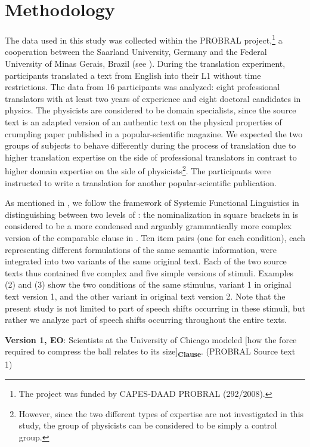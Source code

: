 \documentclass[output=paper]{LSP/langsci}
\begin{document}
\section{Methodology}\label{serbinaetal:sec:3}
The %
data used in this study was collected within the PROBRAL project,\footnote{The project was funded by CAPES-DAAD PROBRAL (292/2008).} a cooperation between the Saarland University, Germany and the Federal University of Minas Gerais, Brazil (see \citealt{Neumann2010}). During the translation experiment, participants translated a text from English into their L1  without time restrictions. The data from 16 participants was analyzed: eight professional translators with at least two years of experience and eight doctoral candidates in physics. The physicists are considered to be domain specialists, since the source text is an adapted version of an authentic text on the physical properties of crumpling paper published in a popular-scientific magazine. We expected the two groups of subjects to behave differently during the process of translation due to higher translation expertise on the side of professional translators in contrast to higher domain expertise on the side of physicists\footnote{However, since the two different types of expertise are not investigated in this study, the group of physicists can be considered to be simply a control group.}. The participants were instructed to write a translation for another popular-scientific publication. 

As mentioned in , we follow the framework of Systemic Functional Linguistics in distinguishing between two levels of : the nominalization in square brackets in  is considered to be a more condensed and arguably grammatically more complex version of the comparable clause in . Ten item pairs (one for each condition), each representing different formulations of the same semantic information, were integrated into two variants of the same original text. Each of the two source texts thus contained five complex and five simple versions of stimuli.  Examples (2) and (3) show the two conditions of the same stimulus, variant 1 in original text version 1, and the other variant in original text version 2. Note that the present study is not limited to part of speech shifts occurring in these stimuli, but rather we analyze part of speech shifts occurring throughout the entire texts. 

\ea \label{serbinaetal:ex:2}
\textbf{Version 1, EO}: Scientists at the University of Chicago modeled $[$how the force required to compress the ball relates to its size$]$\textsubscript{\textbf{Clause}}. (PROBRAL Source text 1)
\z
\end{document}
